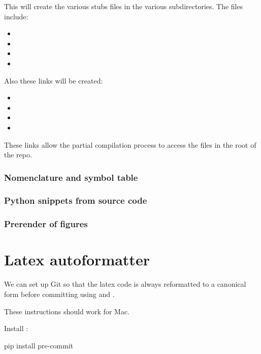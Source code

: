 This will create the various stubs files in the various subdirectories.
The files include:
\begin{itemize}
	\item {}
	\item {}
	\item {}
	\item {}
\end{itemize}
Also these links will be created:
\begin{itemize}
	\item {}
	\item {}
	\item {}
	\item {}
\end{itemize}
These links allow the partial compilation process to access the files in the root of the repo.

\subsubsection{Nomenclature and symbol table}


\subsubsection{Python snippets from source code}


\subsubsection{Prerender of figures}


\section{Latex autoformatter}
\label{sec:latex-autoformatter}

We can set up Git so that the latex code is always reformatted to a canonical form before committing using  and .

These instructions should work for Mac.

Install :
%
\begin{console}
	pip install pre-commit
\end{console}
%

